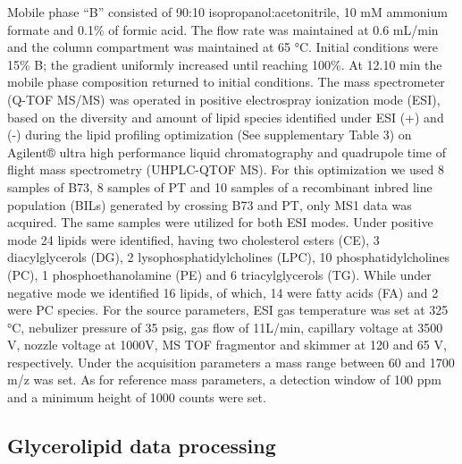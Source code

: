 \documentclass[9pt,twocolumn,twoside]{BioRxiv}
\begin{document}
Mobile phase “B” consisted of 90:10 isopropanol:acetonitrile, 10 mM ammonium formate and 0.1\% of formic acid. 
The flow rate was maintained at 0.6 mL/min and the column compartment was maintained at 65 °C. Initial conditions were 15\% B; the gradient uniformly increased until reaching 100\%. 
At 12.10 min the mobile phase composition returned to initial conditions.
The mass spectrometer (Q-TOF MS/MS) was operated in positive electrospray ionization mode (ESI), based on the diversity and amount of lipid species identified under ESI (+) and (-) during the lipid profiling optimization (See supplementary Table 3) on Agilent® ultra high performance liquid chromatography and quadrupole time of flight mass spectrometry (UHPLC-QTOF MS). 
For this optimization we used 8 samples of B73, 8 samples of PT and 10 samples of a recombinant inbred line population (BILs) generated by crossing B73 and PT, only MS1 data was acquired. 
The same samples were utilized for both ESI modes. 
Under positive mode 24 lipids were identified, having two cholesterol esters (CE), 3 diacylglycerols (DG), 2 lysophosphatidylcholines (LPC), 10 phosphatidylcholines (PC), 1 phosphoethanolamine (PE) and 6 triacylglycerols (TG). 
While under negative mode we identified 16 lipids, of which, 14 were fatty acids (FA) and 2 were PC species. 
For the source parameters, ESI gas temperature was set at 325 °C, nebulizer pressure of 35 psig, gas flow of 11L/min, capillary voltage at 3500 V, nozzle voltage at 1000V, MS TOF fragmentor and skimmer at 120 and 65 V, respectively.
Under the acquisition parameters a mass range between 60 and 1700 m/z was set. As for reference mass parameters, a detection window of 100 ppm and a minimum height of 1000 counts were set. 

\subsection{Glycerolipid data processing}
\end{document}
